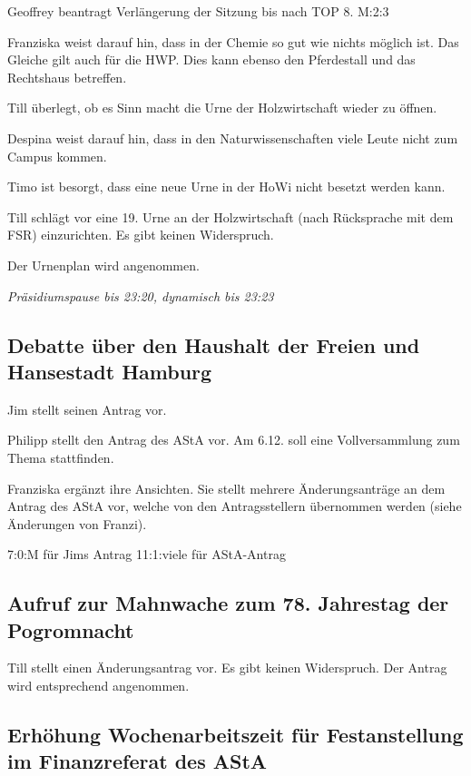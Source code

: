 \documentclass[ngerman,headheight=70pt]{scrartcl}
\begin{document}
    Geoffrey beantragt Verlängerung der Sitzung bis nach TOP 8. M:2:3

    Franziska weist darauf hin, dass in der Chemie so gut wie nichts möglich ist.
    Das Gleiche gilt auch für die HWP. Dies kann ebenso den Pferdestall und das
    Rechtshaus betreffen.

    Till überlegt, ob es Sinn macht die Urne der Holzwirtschaft wieder zu öffnen.

    Despina weist darauf hin, dass in den Naturwissenschaften viele Leute nicht
    zum Campus kommen.

    Timo ist besorgt, dass eine neue Urne in der HoWi nicht besetzt werden kann.

    Till schlägt vor eine 19. Urne an der Holzwirtschaft (nach Rücksprache mit
    dem FSR) einzurichten. Es gibt keinen Widerspruch.

    Der Urnenplan wird angenommen.

    \textit{Präsidiumspause bis 23:20, dynamisch bis 23:23}

    \subsection{Debatte über den Haushalt der Freien und Hansestadt Hamburg}

    Jim stellt seinen Antrag vor.

    Philipp stellt den Antrag des AStA vor.
    Am 6.12. soll eine Vollversammlung zum Thema stattfinden.

    Franziska ergänzt ihre Ansichten. Sie stellt mehrere Änderungsanträge an dem
    Antrag des AStA vor, welche von den Antragsstellern übernommen werden
    (siehe Änderungen von Franzi).

    7:0:M für Jims Antrag
    11:1:viele für AStA-Antrag

    \subsection{Aufruf zur Mahnwache zum 78. Jahrestag der Pogromnacht}

    Till stellt einen Änderungsantrag vor. Es gibt keinen Widerspruch.
    Der Antrag wird entsprechend angenommen.

    \subsection{Erhöhung Wochenarbeitszeit für Festanstellung im Finanzreferat des AStA}
\end{document}
